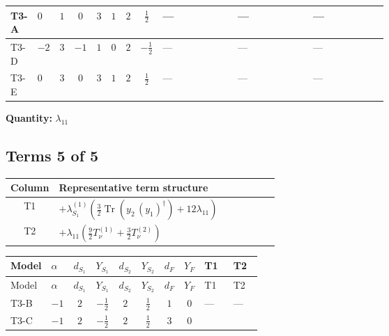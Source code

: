 \documentclass[8pt]{article}
\begin{document}
\begin{landscape}
\begin{longtable}{@{}llcccccc >{\raggedright\arraybackslash}p{0.21\linewidth} >{\raggedright\arraybackslash}p{0.21\linewidth} >{\raggedright\arraybackslash}p{0.21\linewidth}@{}}
\midrule
T3-A & $0$ & $1$ & $0$ & $3$ & $1$ & $2$ & $\frac{1}{2}$ & --- & --- & --- \\
\midrule
T3-D & $-2$ & $3$ & $-1$ & $1$ & $0$ & $2$ & $-\frac{1}{2}$ & --- & --- & --- \\
\midrule
T3-E & $0$ & $3$ & $0$ & $3$ & $1$ & $2$ & $\frac{1}{2}$ & --- & --- & --- \\
\midrule
\bottomrule
\end{longtable}
\clearpage
\noindent\textbf{Quantity: }$\lambda_{11}$\par\smallskip
\subsection*{Terms 5 of 5}
\begin{center}
\begin{tabular}{@{}c >{\raggedright\arraybackslash}p{0.82\linewidth}@{}}
\toprule
Column & Representative term structure \\
\midrule
T1 & \(\displaystyle +{\lambda_{S_1}^{(1)}} \left(\frac{3}{2} \operatorname{Tr}\!\left({y_2}\,\left({y_1}\right)^{\dagger}\right)+12 {\lambda_{11}}\right)\) \\
\midrule
T2 & \(\displaystyle +{\lambda_{11}} \left(\frac{9}{2} T_{\nu}^{(1)}+\frac{3}{2} T_{\nu}^{(2)}\right)\) \\
\midrule
\bottomrule
\end{tabular}
\end{center}
\smallskip
\tiny
\begin{longtable}{@{}llcccccc >{\raggedright\arraybackslash}p{0.21\linewidth} >{\raggedright\arraybackslash}p{0.21\linewidth}@{}}
\toprule
Model & $\alpha$ & $d_{S_1}$ & $Y_{S_1}$ & $d_{S_2}$ & $Y_{S_2}$ & $d_F$ & $Y_F$ & T1 & T2 \\
\midrule
\endfirsthead
\toprule
Model & $\alpha$ & $d_{S_1}$ & $Y_{S_1}$ & $d_{S_2}$ & $Y_{S_2}$ & $d_F$ & $Y_F$ & T1 & T2 \\
\midrule
\endhead
T3-B & $-1$ & $2$ & $-\frac{1}{2}$ & $2$ & $\frac{1}{2}$ & $1$ & $0$ & --- & --- \\
\midrule
T3-C & $-1$ & $2$ & $-\frac{1}{2}$ & $2$ & $\frac{1}{2}$ & $3$ & $0$ & \scriptsize\adjustbox{max width=\linewidth}{$\begin{gathered} +{\lambda_{S_1}^{(1)}} \left(\frac{3}{2} \operatorname{Tr}\!\left({y_2}\,\left({y_1}\right)^{\dagger}\right)+12 {\lambda_{11}}\right)\end{gathered}$} & \scriptsize\adjustbox{max width=\linewidth}{$\begin{gathered} +{\lambda_{11}} \left(\frac{9}{2} T_{\nu}^{(1)}+\frac{3}{2} T_{\nu}^{(2)}\right)\end{gathered}$} \\

\end{longtable}
\end{landscape}
\end{document}
